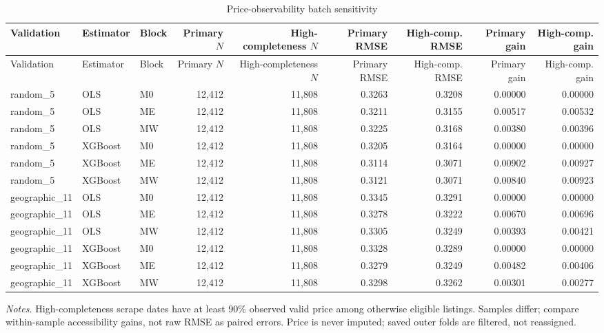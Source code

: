 \begin{landscape}
\small
\begin{longtable}{>{\raggedright\arraybackslash}p{2.8cm}>{\raggedright\arraybackslash}p{2cm}>{\raggedright\arraybackslash}p{1.6cm}rrrrrr}
\caption{Price-observability batch sensitivity}\label{tab:app-price-observability}\\
\toprule
Validation & Estimator & Block & Primary $N$ & High-completeness $N$ & Primary RMSE & High-comp. RMSE & Primary gain & High-comp. gain \\
\midrule
\endfirsthead
\toprule
Validation & Estimator & Block & Primary $N$ & High-completeness $N$ & Primary RMSE & High-comp. RMSE & Primary gain & High-comp. gain \\
\midrule
\endhead
random\_\allowbreak{}5 & OLS & M0 & 12,412 & 11,808 & 0.3263 & 0.3208 & 0.00000 & 0.00000 \\
random\_\allowbreak{}5 & OLS & ME & 12,412 & 11,808 & 0.3211 & 0.3155 & 0.00517 & 0.00532 \\
random\_\allowbreak{}5 & OLS & MW & 12,412 & 11,808 & 0.3225 & 0.3168 & 0.00380 & 0.00396 \\
random\_\allowbreak{}5 & XGBoost & M0 & 12,412 & 11,808 & 0.3205 & 0.3164 & 0.00000 & 0.00000 \\
random\_\allowbreak{}5 & XGBoost & ME & 12,412 & 11,808 & 0.3114 & 0.3071 & 0.00902 & 0.00927 \\
random\_\allowbreak{}5 & XGBoost & MW & 12,412 & 11,808 & 0.3121 & 0.3071 & 0.00840 & 0.00923 \\
geographic\_\allowbreak{}11 & OLS & M0 & 12,412 & 11,808 & 0.3345 & 0.3291 & 0.00000 & 0.00000 \\
geographic\_\allowbreak{}11 & OLS & ME & 12,412 & 11,808 & 0.3278 & 0.3222 & 0.00670 & 0.00696 \\
geographic\_\allowbreak{}11 & OLS & MW & 12,412 & 11,808 & 0.3305 & 0.3249 & 0.00393 & 0.00421 \\
geographic\_\allowbreak{}11 & XGBoost & M0 & 12,412 & 11,808 & 0.3328 & 0.3289 & 0.00000 & 0.00000 \\
geographic\_\allowbreak{}11 & XGBoost & ME & 12,412 & 11,808 & 0.3279 & 0.3249 & 0.00482 & 0.00406 \\
geographic\_\allowbreak{}11 & XGBoost & MW & 12,412 & 11,808 & 0.3298 & 0.3262 & 0.00301 & 0.00277 \\
\bottomrule
\end{longtable}
{\footnotesize\noindent\emph{Notes.} High-completeness scrape dates have at least 90\% observed valid price among otherwise eligible listings. Samples differ; compare within-sample accessibility gains, not raw RMSE as paired errors. Price is never imputed; saved outer folds are filtered, not reassigned.\par}
\end{landscape}
